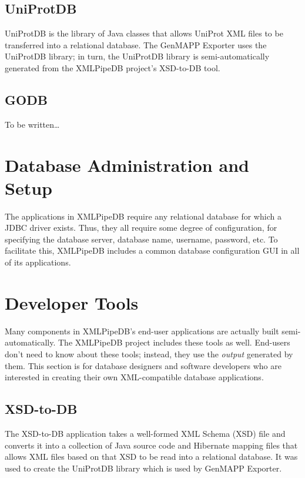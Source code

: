 \documentclass[11pt]{article}
\begin{document}
\subsection{UniProtDB}

UniProtDB is the library of Java classes that allows UniProt XML files to be transferred into a relational database.  The GenMAPP Exporter uses the UniProtDB library; in turn, the UniProtDB library is semi-automatically generated from the XMLPipeDB project's XSD-to-DB tool.

\subsection{GODB}

To be written\ldots

\section{Database Administration and Setup}
\label{dbsetup}

The applications in XMLPipeDB require any relational database for which a JDBC driver exists.  Thus, they all require some degree of configuration, for specifying the database server, database name, username, password, etc.  To facilitate this, XMLPipeDB includes a common database configuration GUI in all of its applications.

\section{Developer Tools}
\label{devtools}

Many components in XMLPipeDB's end-user applications are actually built semi-au\-to\-mat\-ic\-al\-ly.  The XMLPipeDB project includes these tools as well.  End-users don't need to know about these tools; instead, they use the \emph{output} generated by them.  This section is for database designers and software developers who are interested in creating their own XML-compatible database applications.

\subsection{XSD-to-DB}

The XSD-to-DB application takes a well-formed XML Schema (XSD) file and converts it into a collection of Java source code and Hibernate mapping files that allows XML files based on that XSD to be read into a relational database.  It was used to create the UniProtDB library which is used by GenMAPP Exporter.
\end{document}
